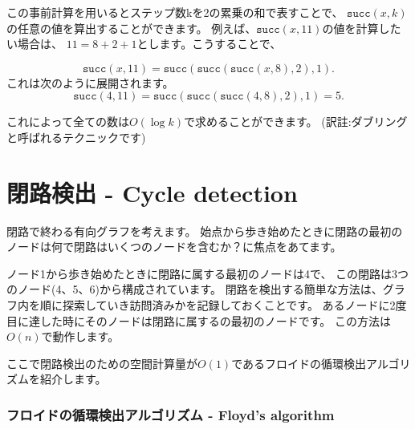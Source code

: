 この事前計算を用いるとステップ数kを2の累乗の和で表すことで、
$\texttt{succ}(x,k)$の任意の値を算出することができます。
例えば、$\texttt{succ}(x,11)$の値を計算したい場合は、
$11 = 8 + 2 + 1$とします。こうすることで、

\[\texttt{succ}(x,11)=\texttt{succ}(\texttt{succ}(\texttt{succ}(x,8),2),1).\]
これは次のように展開されます。
\[\texttt{succ}(4,11)=\texttt{succ}(\texttt{succ}(\texttt{succ}(4,8),2),1)=5.\]

これによって全ての数は$O(\log k)$で求めることができます。
(訳註:ダブリングと呼ばれるテクニックです)

\section{閉路検出 - Cycle detection}


閉路で終わる有向グラフを考えます。
始点から歩き始めたときに閉路の最初のノードは何で閉路はいくつのノードを含むか？に焦点をあてます。
\begin{center}
\end{center}

ノード1から歩き始めたときに閉路に属する最初のノードは4で、
この閉路は3つのノード(4、5、6)から構成されています。
閉路を検出する簡単な方法は、グラフ内を順に探索していき訪問済みかを記録しておくことです。
あるノードに2度目に達した時にそのノードは閉路に属するの最初のノードです。
この方法は$O(n)$で動作します。

ここで閉路検出のための空間計算量が$O(1)$であるフロイドの循環検出アルゴリズムを紹介します。

\subsubsection{フロイドの循環検出アルゴリズム - Floyd's algorithm}


